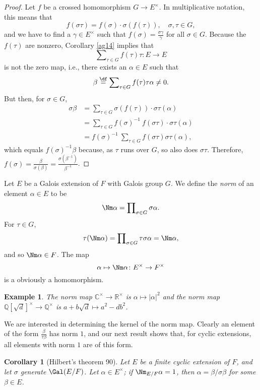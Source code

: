 \documentclass[a4paper,11pt,final,openany]{memoir}
\newtheorem{corollary}[X]{Corollary}
\newtheorem{example}[X]{Example}
\theoremstyle{nonumberplain}
\newtheorem{proof}{Proof.}
\begin{document}
\begin{proof}
Let $f$ be a crossed homomorphism $G\rightarrow E^{\times}$. In multiplicative
notation, this means that
\[
f(\sigma\tau)=f(\sigma)\cdot\sigma(f(\tau)),\quad\sigma,\tau\in G,
\]
and we have to find a $\gamma\in E^{\times}$ such that $f(\sigma)=\frac
{\sigma\gamma}{\gamma}$ for all $\sigma\in G$. Because the $f(\tau)$ are
nonzero, Corollary \ref{ag14} implies that
\[
\sum\nolimits_{\tau\in G}f(\tau)\tau\colon E\rightarrow E
\]
is not the zero map, i.e., there exists an $\alpha\in E$ such that
\[
\beta\overset{\df}{=}\sum\nolimits_{\tau\in G}f(\tau
)\tau\alpha\neq0.
\]
But then, for $\sigma\in G$,
\begin{align*}
\sigma\beta &  =\sum\nolimits_{\tau\in G}\sigma(f(\tau))\cdot\sigma\tau
(\alpha)\\
&  =\sum\nolimits_{\tau\in G}f(\sigma)^{-1}\ f(\sigma\tau)\cdot\sigma
\tau(\alpha)\\
&  =f(\sigma)^{-1}\ \sum\nolimits_{\tau\in G}f(\sigma\tau)\sigma\tau(\alpha),
\end{align*}
which equals $f(\sigma)^{-1}\beta$ because, as $\tau$ runs over $G$, so also
does $\sigma\tau$. Therefore, $f(\sigma)=\frac{\beta}{\sigma(\beta)}%
=\frac{\sigma(\beta^{-1})}{\beta^{-1}}$.
\end{proof}

Let $E$ be a Galois extension of $F$ with Galois group $G$. We define the
\emph{norm}%
%
\emph{\/} of an element $\alpha\in E$ to be
\[
\Nm\alpha=\prod\nolimits_{\sigma\in G}\sigma\alpha.
\]
For $\tau\in G$,
\[
\tau(\Nm\alpha)=\prod\nolimits_{\sigma\in G}\tau\sigma\alpha=\Nm\alpha,
\]
and so $\Nm\alpha\in F$. The map
\[
\alpha\mapsto\Nm\alpha\colon E^{\times}\rightarrow F^{\times}%
\]
is a obviously a homomorphism.

\begin{example}
\label{ag18a}The norm map $\mathbb{C}^{\times}\rightarrow\mathbb{R}^{\times}$
is $\alpha\mapsto|\alpha|^{2}$ and the norm map $\mathbb{Q}[\sqrt{d}]^{\times
}\rightarrow\mathbb{Q}^{\times}$ is $a+b\sqrt{d}\mapsto a^{2}-db^{2}$.
\end{example}

We are interested in determining the kernel of the norm map. Clearly an
element of the form $\frac{\beta}{\tau\beta}$ has norm $1$, and our next
result shows that, for cyclic extensions, all elements with norm $1$ are of
this form.

\begin{corollary}
[Hilbert's theorem 90]\label{ag19}Let $E$ be a finite cyclic extension of $F$,
and let $\sigma$ generate $\Gal(E/F)$. Let $\alpha\in E^{\times}$; if
$\Nm_{E/F}\alpha=1$, then $\alpha=\beta/\sigma\beta$ for some $\beta\in E$.
\end{corollary}
\end{document}
